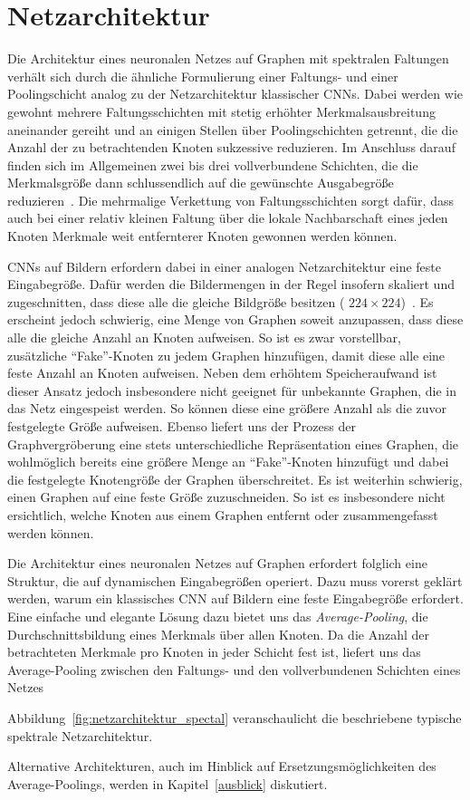 \section{Netzarchitektur}
\label{spektrale_netzarchitektur}

Die Architektur eines neuronalen Netzes auf Graphen mit spektralen Faltungen verhält sich durch die ähnliche Formulierung einer Faltungs- und einer Poo\-ling\-sch\-icht analog zu der Netzarchitektur klassischer \glspl{CNN}.
Dabei werden wie gewohnt mehrere Faltungsschichten mit stetig erhöhter Merkmalsausbreitung aneinander gereiht und an einigen Stellen über Poolingschichten getrennt, die die Anzahl der zu betrachtenden Knoten sukzessive reduzieren.
Im Anschluss darauf finden sich im Allgemeinen zwei bis drei vollverbundene Schichten, die die Merkmalsgröße dann schlussendlich auf die gewünschte Ausgabegröße reduzieren~\cite{Nielsen}.
Die mehrmalige Verkettung von Faltungsschichten sorgt dafür, dass auch bei einer relativ kleinen Faltung über die lokale Nachbarschaft eines jeden Knoten Merkmale weit entfernterer Knoten gewonnen werden können.

\glspl{CNN} auf Bildern erfordern dabei in einer analogen Netzarchitektur eine feste Eingabegröße.
Dafür werden die Bildermengen in der Regel insofern skaliert und zugeschnitten, dass diese alle die gleiche Bildgröße besitzen (\zB{} $224 \times 224$)~\cite{spp}.
Es erscheint jedoch schwierig, eine Menge von Graphen soweit anzupassen, dass diese alle die gleiche Anzahl an Knoten aufweisen.
So ist es zwar vorstellbar, zusätzliche \enquote{Fake}-Knoten zu jedem Graphen hinzufügen, damit diese alle eine feste Anzahl an Knoten aufweisen.
Neben dem erhöhtem Speicheraufwand ist dieser Ansatz jedoch insbesondere nicht geeignet für unbekannte Graphen, die in das Netz eingespeist werden.
So können diese \evtl{} eine größere Anzahl als die zuvor festgelegte Größe aufweisen.
Ebenso liefert uns der Prozess der Graphvergröberung eine stets unterschiedliche Repräsentation eines Graphen, die wohlmöglich bereits eine größere Menge an \enquote{Fake}-Knoten hinzufügt und dabei die festgelegte Knotengröße der Graphen überschreitet.
Es ist weiterhin schwierig, einen Graphen auf eine feste Größe zuzuschneiden.
So ist es insbesondere nicht ersichtlich, welche Knoten aus einem Graphen entfernt oder zusammengefasst werden können.

Die Architektur eines neuronalen Netzes auf Graphen erfordert folglich eine Struktur, die auf dynamischen Eingabegrößen operiert.
Dazu muss vorerst geklärt werden, warum ein klassisches \gls{CNN} auf Bildern eine feste Eingabegröße erfordert.
Eine einfache und elegante Lösung dazu bietet uns das \emph{Average-Pooling}, \dhe{} die Durchschnittsbildung eines Merkmals über allen Knoten.
Da die Anzahl der betrachteten Merkmale pro Knoten in jeder Schicht fest ist, liefert uns das Average-Pooling zwischen den Faltungs- und den vollverbundenen Schichten eines Netzes


Abbildung~\ref{fig:netzarchitektur_spectal} veranschaulicht die beschriebene typische spektrale Netzarchitektur.

Alternative Architekturen, auch im Hinblick auf Ersetzungsmöglichkeiten des Average-Poolings, werden in Kapitel~\ref{ausblick} diskutiert.
